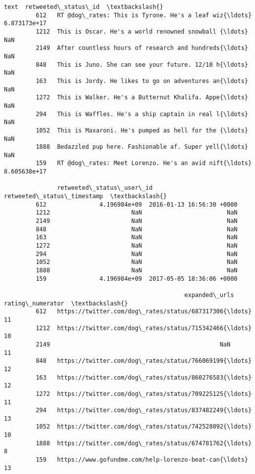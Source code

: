 \documentclass[11pt]{article}
\begin{document}
\begin{Verbatim}[commandchars=\\\{\}]
                                                            text  retweeted\_status\_id  \textbackslash{}
         612   RT @dog\_rates: This is Tyrone. He's a leaf wiz{\ldots}         6.873173e+17   
         1212  This is Oscar. He's a world renowned snowball {\ldots}                  NaN   
         2149  After countless hours of research and hundreds{\ldots}                  NaN   
         848   This is Juno. She can see your future. 12/10 h{\ldots}                  NaN   
         163   This is Jordy. He likes to go on adventures an{\ldots}                  NaN   
         1272  This is Walker. He's a Butternut Khalifa. Appe{\ldots}                  NaN   
         294   This is Waffles. He's a ship captain in real l{\ldots}                  NaN   
         1052  This is Maxaroni. He's pumped as hell for the {\ldots}                  NaN   
         1888  Bedazzled pup here. Fashionable af. Super yell{\ldots}                  NaN   
         159   RT @dog\_rates: Meet Lorenzo. He's an avid nift{\ldots}         8.605638e+17   
         
               retweeted\_status\_user\_id retweeted\_status\_timestamp  \textbackslash{}
         612               4.196984e+09  2016-01-13 16:56:30 +0000   
         1212                       NaN                        NaN   
         2149                       NaN                        NaN   
         848                        NaN                        NaN   
         163                        NaN                        NaN   
         1272                       NaN                        NaN   
         294                        NaN                        NaN   
         1052                       NaN                        NaN   
         1888                       NaN                        NaN   
         159               4.196984e+09  2017-05-05 18:36:06 +0000   
         
                                                   expanded\_urls  rating\_numerator  \textbackslash{}
         612   https://twitter.com/dog\_rates/status/687317306{\ldots}                11   
         1212  https://twitter.com/dog\_rates/status/715342466{\ldots}                10   
         2149                                                NaN                11   
         848   https://twitter.com/dog\_rates/status/766069199{\ldots}                12   
         163   https://twitter.com/dog\_rates/status/860276583{\ldots}                12   
         1272  https://twitter.com/dog\_rates/status/709225125{\ldots}                11   
         294   https://twitter.com/dog\_rates/status/837482249{\ldots}                13   
         1052  https://twitter.com/dog\_rates/status/742528092{\ldots}                10   
         1888  https://twitter.com/dog\_rates/status/674781762{\ldots}                 8   
         159   https://www.gofundme.com/help-lorenzo-beat-can{\ldots}                13   
         

\end{Verbatim}
\end{document}
